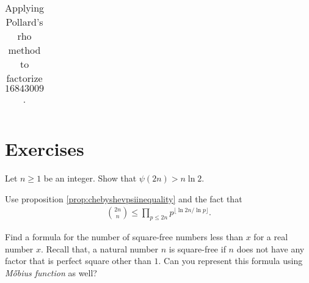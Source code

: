 \documentclass{subfiles}
\begin{document}
\begin{example}
\begin{table}
\begin{tabular}{|c|c|c|c|}
				\hline
			\end{tabular} 
			\caption{Applying Pollard's rho method to factorize $16843009$.}
			\label{table:pollardmodified}
		\end{table}
	\end{example}
	
	\newpage
	\section{Exercises}
	
	\begin{problem}
		Let $n \geq 1$ be an integer. Show that $\psi(2n) >n \ln 2$.
	\end{problem}
	
	\begin{hint}
		Use proposition \eqref{prop:chebyshevpsiinequality} and the fact that
		\begin{align*}
			\binom{2n}{n} \leq \prod_{p \leq 2n} p^{\lfloor\ln 2n/\ln p\rfloor }.
		\end{align*}
	\end{hint}
	
	\begin{problem}
		Find a formula for the number of square-free numbers less than $x$ for a real number $x$. Recall that, a natural number $n$ is square-free if $n$ does not have any factor that is perfect square other than $1$. Can you represent this formula using \textit{M\H obius function} as well?
	\end{problem}
	
\end{document}
